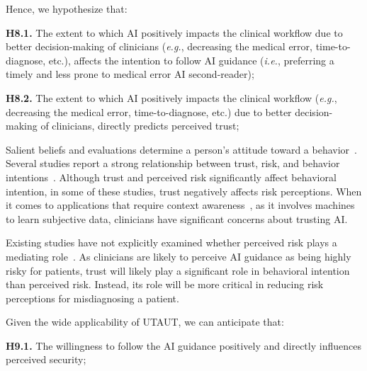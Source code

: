 \noindent
Hence, we hypothesize that:

\vspace{2.00mm}

\noindent
{\bf H8.1.} The extent to which \ac{AI} positively impacts the clinical workflow due to better decision-making of clinicians ({\it e.g.}, decreasing the medical error, time-to-diagnose, etc.), affects the intention to follow \ac{AI} guidance ({\it i.e.}, preferring a timely and less prone to medical error \ac{AI} second-reader);

\vspace{2.00mm}

\noindent
{\bf H8.2.} The extent to which \ac{AI} positively impacts the clinical workflow ({\it e.g.}, decreasing the medical error, time-to-diagnose, etc.) due to better decision-making of clinicians, directly predicts perceived trust;

\vspace{2.00mm}

Salient beliefs and evaluations determine a person's attitude toward a behavior~\cite{KHALILZADEH2017460}.
Several studies report a strong relationship between trust, risk, and behavior intentions~\cite{GANSSER2021101535, WAYMEL2019327}.
Although trust and perceived risk significantly affect behavioral intention, in some of these studies, trust negatively affects risk perceptions.
When it comes to applications that require context awareness~\cite{10.1145/3313831.3376506}, as it involves machines to learn subjective data, clinicians have significant concerns about trusting \ac{AI}.

Existing studies have not explicitly examined whether perceived risk plays a mediating role~\cite{AMEEN2021106548}.
As clinicians are likely to perceive \ac{AI} guidance as being highly risky for patients, trust will likely play a significant role in behavioral intention than perceived risk.
Instead, its role will be more critical in reducing risk perceptions for misdiagnosing a patient.

\vspace{2.00mm}

\noindent
Given the wide applicability of \ac{UTAUT}, we can anticipate that:

\vspace{2.00mm}

\noindent
{\bf H9.1.} The willingness to follow the \ac{AI} guidance positively and directly influences perceived security;

\vspace{2.00mm}

